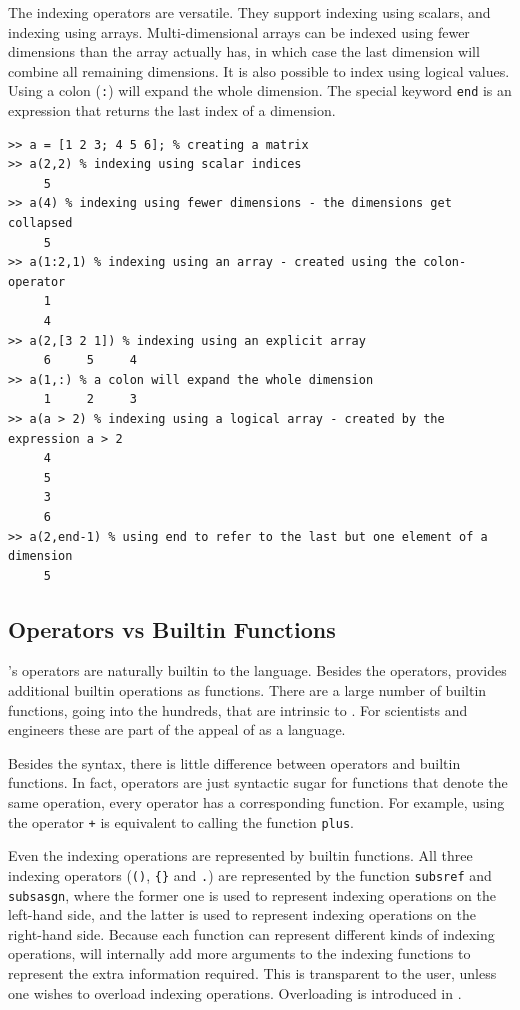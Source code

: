 The \matlab indexing operators are versatile. They support indexing using
scalars, and indexing using arrays. Multi-dimensional arrays can be indexed
using fewer dimensions than the array actually has, in which case the last
dimension will combine all remaining dimensions. It is also possible to index
using logical values. Using a colon ({\tt :}) will expand the whole dimension.
The special keyword {\tt end} is an expression that returns the last index of a dimension.


\begin{lstlisting}
>> a = [1 2 3; 4 5 6]; % creating a matrix
>> a(2,2) % indexing using scalar indices
     5
>> a(4) % indexing using fewer dimensions - the dimensions get collapsed
     5
>> a(1:2,1) % indexing using an array - created using the colon-operator
     1
     4
>> a(2,[3 2 1]) % indexing using an explicit array
     6     5     4
>> a(1,:) % a colon will expand the whole dimension
     1     2     3
>> a(a > 2) % indexing using a logical array - created by the expression a > 2
     4
     5
     3
     6
>> a(2,end-1) % using end to refer to the last but one element of a dimension
     5
\end{lstlisting}



\subsection{Operators vs Builtin Functions}
\label{sec:OpVsFn}

\matlab's operators are naturally builtin to the language. Besides the operators, 
\matlab provides additional builtin operations as functions. There are
a large number of builtin functions, going into the hundreds, that are
intrinsic to \matlab.  For scientists and engineers these are part of
the appeal of \matlab as a language. 

Besides the syntax, there is
little difference between operators and builtin functions. In fact,
operators are just syntactic sugar for functions that denote the same
operation, every operator has a corresponding function. For example,
using the operator
\lstinline{+} is equivalent to calling the function \lstinline{plus}.

Even the indexing operations are represented by builtin functions.
All three indexing operators ({\tt ()}, {\tt \{\}} and {\tt .}) are
represented by the function {\tt subsref} and {\tt subsasgn}, where the former one
is used to represent indexing operations on the left-hand side, and the latter 
is used to represent indexing operations on the right-hand side.
Because each function can represent different kinds of indexing operations,
\matlab will internally add more arguments to the indexing functions
to represent the extra information required. This is transparent to the user,
unless one wishes to overload indexing operations. Overloading is introduced in
.



